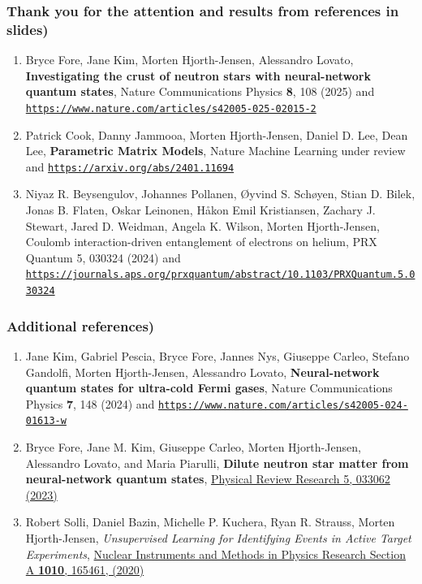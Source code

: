 \documentclass{beamer}
\begin{document}
\begin{frame}
\frametitle{Thank you for the attention and results from references in slides)}
\begin{enumerate}

\item Bryce Fore, Jane Kim, Morten Hjorth-Jensen, Alessandro Lovato, \textbf{Investigating the crust of neutron stars with neural-network quantum states}, Nature Communications Physics \textbf{8}, 108  (2025) and \href{{https://www.nature.com/articles/s42005-025-02015-2}}{\nolinkurl{https://www.nature.com/articles/s42005-025-02015-2}}

\item Patrick Cook, Danny Jammooa, Morten Hjorth-Jensen, Daniel D. Lee, Dean Lee, \textbf{Parametric Matrix Models}, Nature Machine Learning  under review and \href{{https://arxiv.org/abs/2401.11694}}{\nolinkurl{https://arxiv.org/abs/2401.11694}}

\item Niyaz R. Beysengulov, Johannes Pollanen, Øyvind S. Schøyen, Stian D. Bilek, Jonas B. Flaten, Oskar Leinonen, Håkon Emil Kristiansen, Zachary J. Stewart, Jared D. Weidman, Angela K. Wilson, Morten Hjorth-Jensen, Coulomb interaction-driven entanglement of electrons on helium, PRX Quantum 5, 030324 (2024) and \href{{https://journals.aps.org/prxquantum/abstract/10.1103/PRXQuantum.5.030324}}{\nolinkurl{https://journals.aps.org/prxquantum/abstract/10.1103/PRXQuantum.5.030324}}

\end{enumerate}
\end{frame}



\begin{frame}
\frametitle{Additional references)}
\begin{enumerate}

\item Jane Kim, Gabriel Pescia, Bryce Fore, Jannes Nys, Giuseppe Carleo, Stefano Gandolfi, Morten Hjorth-Jensen, Alessandro Lovato, \textbf{Neural-network quantum states for ultra-cold Fermi gases}, Nature Communications Physics \textbf{7}, 148 (2024) and \href{{https://www.nature.com/articles/s42005-024-01613-w}}{\nolinkurl{https://www.nature.com/articles/s42005-024-01613-w}}

\item Bryce Fore, Jane M. Kim, Giuseppe Carleo, Morten Hjorth-Jensen, Alessandro Lovato, and Maria Piarulli, \textbf{Dilute neutron star matter from neural-network quantum states}, \href{{https://journals.aps.org/prresearch/abstract/10.1103/PhysRevResearch.5.033062}}{Physical Review  Research 5, 033062 (2023)}

\item Robert Solli, Daniel Bazin, Michelle P. Kuchera, Ryan R. Strauss, Morten Hjorth-Jensen, \emph{Unsupervised Learning for Identifying Events in Active Target Experiments}, \href{{https://www.sciencedirect.com/science/article/abs/pii/S0168900221004460}}{Nuclear Instruments and Methods in Physics Research Section A \textbf{1010}, 165461, (2020)}

\end{enumerate}
\end{frame}
\end{document}

